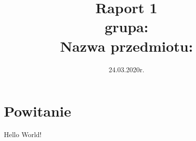 \documentclass[a4paper]{mwart}
\title{Raport 1 \\ grupa: \grupadziekanska\\Nazwa przedmiotu: \nazwaprzedmiotu}
\date{24.03.2020r.}
\author{\Student}
\begin{document}
	\maketitle
	
	\tableofcontents
	\section{Powitanie}
	
	Hello World!
	
\end{document}
